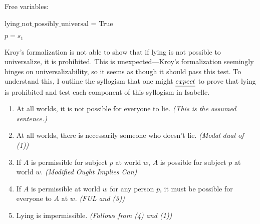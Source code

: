 \begin{isabellebody}
{  Free variables:

    $\text{lying\_not\_possibly\_universal}$ = True

    $p = s_1$ \color{black}%
}%
\endisatagproof
{\isafoldproof}%
%
\isadelimproof
%
\endisadelimproof
%
\begin{isamarkuptext}%
Kroy's formalization is not able to show that if lying is not possible 
      to universalize, it is prohibited. This is unexpected—Kroy's formalization seemingly hinges
on universalizability, so it seems as though it should pass this test. To understand this, I 
  outline the syllogism that one might $\emph{expect}$ to prove that lying is prohibited and 
test each component of this syllogism in Isabelle.

\begin{enumerate}
        \item At all worlds, it is not possible for everyone to lie. \emph{(This is the assumed sentence.)}
        \item At all worlds, there is necessarily someone who doesn't lie. \emph{(Modal dual of (1))}
        \item If $A$ is permissible for subject $p$ at world $w$, $A$ is possible for subject $p$ at world $w$. \emph{(Modified Ought Implies Can)}
        \item If $A$ is permissible at world $w$ for any person $p$, it must be possible for everyone to $A$ at $w$. \emph{(FUL and (3))}
        \item Lying is impermissible. \emph{(Follows from (4) and (1))} \end{enumerate}


\end{isamarkuptext}
\end{isabellebody}
